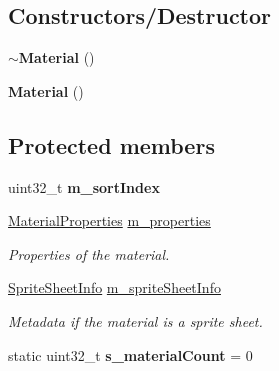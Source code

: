 \subsection*{Constructors/\+Destructor}
\begin{DoxyCompactItemize}
\item 
\mbox{\label{classrev_1_1_material_af26b9c648cf59415e4cd8d47609474d4}} 
{\bfseries $\sim$\+Material} ()
\item 
\mbox{\label{classrev_1_1_material_a49318b2cb181e6c5e852502104a54c74}} 
{\bfseries Material} ()
\end{DoxyCompactItemize}
\subsection*{Protected members}
\begin{DoxyCompactItemize}
\item 
\mbox{\label{classrev_1_1_material_a18b2592ededb7b7443102c143fae4b2c}} 
uint32\+\_\+t {\bfseries m\+\_\+sort\+Index}
\item 
\mbox{\label{classrev_1_1_material_a160517f94ab40dcdbb3a55a5500b3220}} 
\mbox{\hyperlink{structrev_1_1_material_properties}{Material\+Properties}} \mbox{\hyperlink{classrev_1_1_material_a160517f94ab40dcdbb3a55a5500b3220}{m\+\_\+properties}}
\begin{DoxyCompactList}\small\item\em Properties of the material. \end{DoxyCompactList}\item 
\mbox{\label{classrev_1_1_material_a914dd5933f9eb2f7141bfb7c64c5d7f2}} 
\mbox{\hyperlink{structrev_1_1_sprite_sheet_info}{Sprite\+Sheet\+Info}} \mbox{\hyperlink{classrev_1_1_material_a914dd5933f9eb2f7141bfb7c64c5d7f2}{m\+\_\+sprite\+Sheet\+Info}}
\begin{DoxyCompactList}\small\item\em Metadata if the material is a sprite sheet. \end{DoxyCompactList}\item 
\mbox{\label{classrev_1_1_material_a57b2243d2f2e36828e9ba98798261090}} 
static uint32\+\_\+t {\bfseries s\+\_\+material\+Count} = 0
\end{DoxyCompactItemize}
